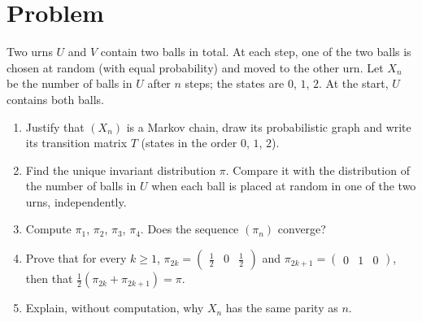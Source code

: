 \section{Problem}
\begin{problem}
Two urns $U$ and $V$ contain two balls in total. At each step, one of the two balls is chosen at random (with equal probability) and moved to the other urn. Let $X_n$ be the number of balls in $U$ after $n$ steps; the states are $0$, $1$, $2$. At the start, $U$ contains both balls.
\begin{enumerate}
\item Justify that $(X_n)$ is a Markov chain, draw its probabilistic graph and write its transition matrix $T$ (states in the order $0$, $1$, $2$).
\item Find the unique invariant distribution $\pi$. Compare it with the distribution of the number of balls in $U$ when each ball is placed at random in one of the two urns, independently.
\item Compute $\pi_1$, $\pi_2$, $\pi_3$, $\pi_4$. Does the sequence $(\pi_n)$ converge?
\item Prove that for every $k\ge1$, $\pi_{2k}=\begin{pmatrix}\frac12&0&\frac12\end{pmatrix}$ and $\pi_{2k+1}=\begin{pmatrix}0&1&0\end{pmatrix}$, then that $\frac12\left(\pi_{2k}+\pi_{2k+1}\right)=\pi$.
\item Explain, without computation, why $X_n$ has the same parity as $n$.
\end{enumerate}
\end{problem}
